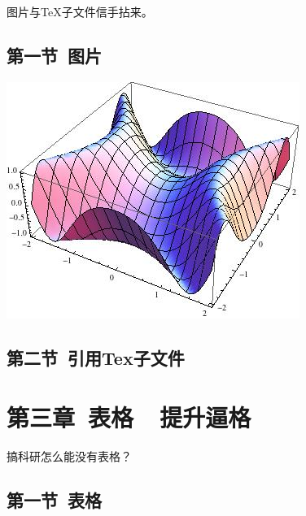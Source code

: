 \documentclass{ctexart}
\begin{document}
图片与TeX子文件信手拈来。

\subsection{第一节\ 图片}

\begin{center}
\includegraphics[scale=0.4]{include_picture/picture.jpg}\par
\end{center}

\subsection{第二节\ 引用Tex子文件}






\clearpage
\section{第三章\ 表格\ \ 提升逼格}

搞科研怎么能没有表格？\\

\subsection{第一节\ 表格}
\end{document}
